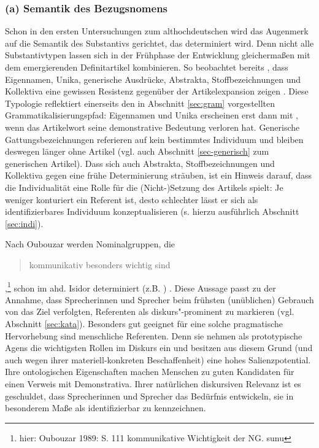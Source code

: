 \subsubsection{(a) Semantik des Bezugsnomens} 
Schon in den ersten Untersuchungen zum althochdeutschen  wird das Augenmerk auf die Semantik des Substantivs gerichtet, das determiniert wird. Denn nicht alle Substantivtypen lassen sich in der Frühphase der Entwicklung gleichermaßen mit dem emergierenden Definitartikel kombinieren. So beobachtet bereits \textcite{Graf1905}, dass Eigennamen, Unika, generische Ausdrücke, Abstrakta, Stoffbezeichnungen und Kollektiva eine gewissen Resistenz gegenüber der Artikelexpansion zeigen \parencite[ähnlich][]{Bell1907, Hodler1954}. Diese Typologie reflektiert einerseits den in Abschnitt \ref{sec:gram} vorgestellten Grammatikalisierungspfad: Eigennamen und Unika erscheinen erst dann mit , wenn das Artikelwort seine demonstrative Bedeutung verloren hat. Generische Gattungsbezeichnungen referieren auf kein bestimmtes Individuum und bleiben deswegen länger ohne Artikel (vgl. auch Abschnitt \ref{sec-generisch} zum generischen Artikel). Dass sich auch Abstrakta, Stoffbezeichnungen und Kollektiva  gegen eine frühe Determinierung sträuben, ist ein Hinweis darauf, dass die Individualität eine Rolle für die (Nicht-)Setzung des Artikels spielt: Je weniger konturiert ein Referent ist, desto schlechter lässt er sich als identifizierbares Individuum konzeptualisieren (s. hierzu ausführlich Abschnitt \ref{sec:indi}). 

Nach Oubouzar werden Nominalgruppen, die \blockcquote[75]{Oubouzar1992}{kommunikativ besonders wichtig sind},\footnote{hier: Oubouzar 1989: S. 111 kommunikative Wichtigkeit der NG. sunu} schon im ahd. Isidor determiniert (z.B.  ) \parencite[vgl. auch][117f.]{Oubouzar1989}.  
Diese Aussage passt zu der Annahme, dass Sprecherinnen  und Sprecher beim frühsten (unüblichen) Gebrauch von  das Ziel verfolgten, Referenten als diskurs"-prominent zu markieren (vgl. Abschnitt \ref{sec:kata}). 
Besonders gut geeignet für eine solche pragmatische Hervorhebung sind menschliche Referenten. Denn sie nehmen als prototypische Agens die wichtigsten Rollen im Diskurs ein und besitzen aus diesem Grund (und auch wegen ihrer materiell-konkreten Beschaffenheit) eine hohes Salienzpotential. Ihre ontologischen Eigenschaften machen Menschen zu guten Kandidaten für einen Verweis mit  Demonstrativa. Ihrer natürlichen diskursiven Relevanz ist es geschuldet, dass Sprecherinnen und Sprecher das Bedürfnis entwickeln, sie in besonderem Maße als identifizierbar zu kennzeichnen. 

